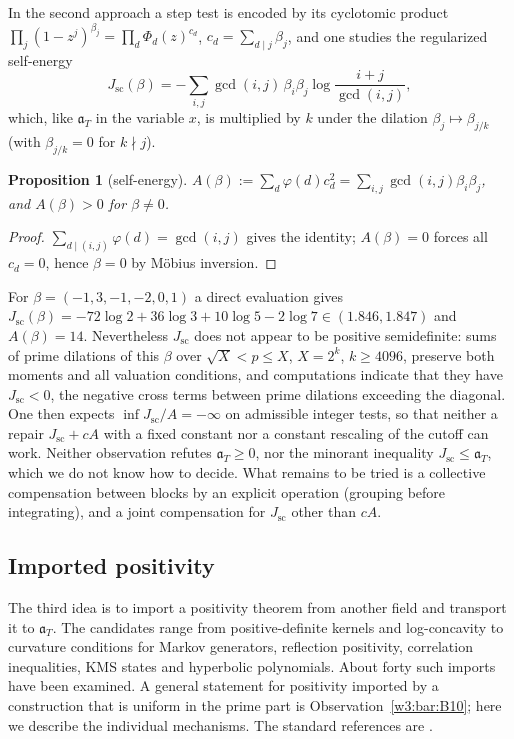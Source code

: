 \documentclass[11pt]{amsart}
\newtheorem{proposition}[theorem]{Proposition}
\theoremstyle{definition}
\theoremstyle{remark}
\numberwithin{equation}{section}
\newcommand{\aT}{\mathfrak{a}_T}                       %
\begin{document}
In the second approach a step test is encoded by its cyclotomic product
$\prod_j(1-z^j)^{\beta_j}=\prod_d\Phi_d(z)^{c_d}$, $c_d=\sum_{d\mid j}\beta_j$, and one studies the regularized
self-energy
\[
J_{\mathrm{sc}}(\beta)=-\sum_{i,j}\gcd(i,j)\,\beta_i\beta_j\log\frac{i+j}{\gcd(i,j)},
\]
which, like $\aT$ in the variable $x$, is multiplied by $k$ under the dilation $\beta_j\mapsto\beta_{j/k}$ (with $\beta_{j/k}=0$ for $k\nmid j$).

\begin{proposition}[self-energy]\label{w4:prop:selfenergy}
$A(\beta):=\sum_d\varphi(d)c_d^2=\sum_{i,j}\gcd(i,j)\beta_i\beta_j$, and $A(\beta)>0$ for $\beta\ne0$.
\end{proposition}

\begin{proof}
$\sum_{d\mid(i,j)}\varphi(d)=\gcd(i,j)$ gives the identity; $A(\beta)=0$ forces all $c_d=0$, hence $\beta=0$ by M\"obius inversion.
\end{proof}

For $\beta=(-1,3,-1,-2,0,1)$ a direct evaluation gives
$J_{\mathrm{sc}}(\beta)=-72\log2+36\log3+10\log5-2\log7\in(1.846,1.847)$ and $A(\beta)=14$. Nevertheless $J_{\mathrm{sc}}$
does not appear to be positive semidefinite: sums of prime dilations of this $\beta$ over $\sqrt X<p\le X$, $X=2^k$,
$k\ge4096$, preserve both moments and all valuation conditions, and computations indicate that they have
$J_{\mathrm{sc}}<0$, the negative cross terms between prime dilations exceeding the diagonal. One then expects
$\inf J_{\mathrm{sc}}/A=-\infty$ on admissible integer tests, so that neither a repair $J_{\mathrm{sc}}+cA$ with a fixed
constant nor a constant rescaling of the cutoff can work. Neither observation refutes $\aT\ge0$, nor the minorant
inequality $J_{\mathrm{sc}}\le\aT$, which we do not know how to decide. What remains to be tried is a collective
compensation between blocks by an explicit operation (grouping before integrating), and a joint compensation for
$J_{\mathrm{sc}}$ other than $cA$.

\subsection{Imported positivity}\label{w4:sec:imported}

\label{w4:fam:R6}%
The third idea is to import a positivity theorem from another field and transport it to $\aT$. The candidates range from positive-definite kernels and log-concavity to curvature conditions for Markov
generators, reflection positivity, correlation inequalities, KMS states and hyperbolic polynomials. About forty such
imports have been examined. A general statement for positivity imported by a construction that is uniform in the prime
part is Observation~\ref{w3:bar:B10}; here we describe the individual mechanisms. The standard references are
\cite{Schoenberg1951,Prekopa1973,BrascampLieb1976,BakryEmery1985,BeurlingDeny1959,OsterwalderSchrader1973,BostConnes1995,Garding1959}.
\end{document}
